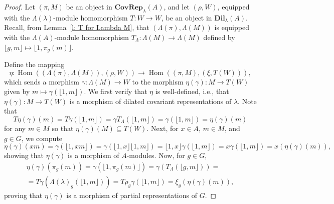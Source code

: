 \documentclass[11pt]{amsart}
\numberwithin{equation}{section}
\theoremstyle{definition}
\theoremstyle{remark}
\newcommand{\Hom}{\operatorname{Hom}}
\begin{document}
\begin{proof}
    Let \((\pi, M)\) be an object in \(\textbf{CovRep}_{\lambda}(A)\), and let \((\rho, W)\), equipped with the \(\Lambda(\lambda)\)-module homomorphism \(T: W \to W\), be an object in \(\textbf{Dil}_{\lambda}(A)\). Recall, from Lemma~\ref{l: T for Lambda M}, that \((\Lambda(\pi), \Lambda(M))\) is equipped with the \(\Lambda(A)\)-module homomorphism \(T_\Lambda: \Lambda(M) \to \Lambda(M)\) defined by \(\lfloor g, m \rfloor \mapsto \lfloor 1, \pi_g(m) \rfloor\).

    Define the mapping
    \[
        \eta: \Hom((\Lambda(\pi), \Lambda(M)), (\rho, W)) \to \Hom((\pi, M), (\xi, T(W))),
    \]
    which sends a morphism \(\gamma: \Lambda(M) \to W\) to the morphism \(\eta(\gamma): M \to T(W)\) given by \(m \mapsto \gamma(\lfloor 1, m \rfloor)\). We first verify that \(\eta\) is well-defined, i.e., that \(\eta(\gamma): M \to T(W)\) is a morphism of  dilated covariant representations of \(\lambda\). 
   Note that
    $$T \eta(\gamma)(m) = T \gamma (\lfloor 1, m \rfloor) = \gamma T_{\Lambda}  (\lfloor 1, m \rfloor) = \gamma   (\lfloor 1, m \rfloor) =  \eta(\gamma)(m) $$ for any $m\in M$  so that
    $ \eta(\gamma)(M) \subseteq T(W).$ 
    Next, for  \(x \in A\), \(m \in M\), and \(g \in G\), we compute
    \[
        \eta(\gamma)(xm) = \gamma(\lfloor 1, xm \rfloor) = \gamma(\lfloor 1, x \rfloor \lfloor 1, m \rfloor) = \lfloor 1, x \rfloor \gamma(\lfloor 1, m \rfloor) = x\gamma(\lfloor 1, m \rfloor)
        = x (\eta(\gamma)(m)),
    \]
    showing that \(\eta(\gamma)\) is a morphism of \(A\)-modules. Now, for \(g \in G\),
\begin{multline*}
\eta(\gamma)(\pi_g(m)) = \gamma(\lfloor 1, \pi_g(m) \rfloor) = \gamma(T_\Lambda(\lfloor g, m \rfloor)) =\\= T\gamma(\Lambda(\lambda)_g(\lfloor 1, m \rfloor))
= T\rho_g\gamma(\lfloor 1, m \rfloor) = \xi_g(\eta(\gamma)(m)),
\end{multline*}    
    proving that \(\eta(\gamma)\) is a morphism of partial representations  of $G.$


\end{proof}
\end{document}
